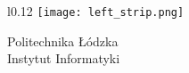 
\begin{titlepage}
	\begin{wrapfigure}{l}{0.12\linewidth}
		\texttt{[image: left\_strip.png]}
	\end{wrapfigure}

	\noindent
	Politechnika Łódzka\\
	\textcolor{defaultRed}{Instytut Informatyki}
\end{titlepage}